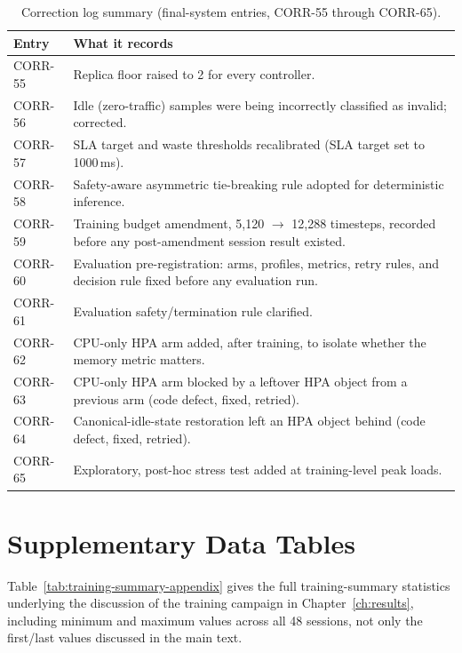 \begin{table}[H]
\centering
\caption[Correction log summary]{Correction log summary (final-system entries, CORR-55 through CORR-65).}
\label{tab:corr-summary}
\small
\begin{tabular}{p{1.6cm}p{11.0cm}}
\toprule
Entry & What it records \\
\midrule
CORR-55 & Replica floor raised to 2 for every controller. \\
CORR-56 & Idle (zero-traffic) samples were being incorrectly classified as invalid; corrected. \\
CORR-57 & SLA target and waste thresholds recalibrated (SLA target set to 1000\,ms). \\
CORR-58 & Safety-aware asymmetric tie-breaking rule adopted for deterministic inference. \\
CORR-59 & Training budget amendment, 5{,}120 $\to$ 12{,}288 timesteps, recorded before any post-amendment session result existed. \\
CORR-60 & Evaluation pre-registration: arms, profiles, metrics, retry rules, and decision rule fixed before any evaluation run. \\
CORR-61 & Evaluation safety/termination rule clarified. \\
CORR-62 & CPU-only HPA arm added, after training, to isolate whether the memory metric matters. \\
CORR-63 & CPU-only HPA arm blocked by a leftover HPA object from a previous arm (code defect, fixed, retried). \\
CORR-64 & Canonical-idle-state restoration left an HPA object behind (code defect, fixed, retried). \\
CORR-65 & Exploratory, post-hoc stress test added at training-level peak loads. \\
\bottomrule
\end{tabular}
\end{table}

\section{Supplementary Data Tables}

Table~\ref{tab:training-summary-appendix} gives the full training-summary
statistics underlying the discussion of the training campaign in
Chapter~\ref{ch:results}, including minimum and maximum values across all
48 sessions, not only the first/last values discussed in the main text.

\begin{table}[H]
\centering
\caption[Training summary statistics]{Training summary statistics (48 analyzed sessions).}
\label{tab:training-summary-appendix}

\end{table}

